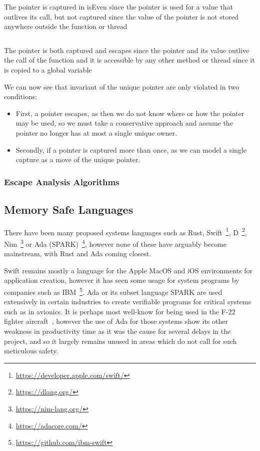 \documentclass{proposal}
\begin{document}
    \begin{listing}
        \inputminted{c++}{code/capture-example.cpp}
        \caption{The pointer is captured in isEven since the pointer is used for a value that outlives its call, but not captured since the value of the pointer is not stored anywhere outside the function or thread}
        \label{lst:capture-example}
    \end{listing}

    \begin{listing}
        \inputminted{c++}{code/escape-example.cpp}
        \caption{The pointer is both captured and escapes since the pointer and its value outlive the call of the function and it is accessible by any other method or thread since it is copied to a global variable}
        \label{lst:escape-example}
    \end{listing}

    We can now see that invariant of the unique pointer are only violated in two conditions:
    \begin{itemize}
        \item First, a pointer escapes, as then we do not know where or how the pointer may be used, so we must take a conservative approach and assume the pointer no longer has at most a single unique owner.
        \item Secondly, if a pointer is captured more than once, as we can model a single capture as a move of the unique pointer.
    \end{itemize}

    \subsubsection{Escape Analysis Algorithms}\label{subsubsec:escape-analysis-algorithms}

    \subsection{Memory Safe Languages}\label{subsec:rust}

    There have been many proposed systems languages such as Rust, Swift~\footnote{\url{https://developer.apple.com/swift/}}, D~\footnote{\url{https://dlang.org/}}, Nim~\footnote{\url{https://nim-lang.org/}} or Ada (SPARK)~\footnote{\url{https://adacore.com/}}, however none of these have arguably become mainstream, with Rust and Ada coming closest.

    Swift remains mostly a language for the Apple MacOS and iOS environments for application creation, however it has seen some usage for system programs by companies such as IBM~\footnote{\url{https://github.com/ibm-swift}}.
    Ada or its subset language SPARK are used extensively in certain industries to create verifiable programs for critical systems such as in avionics.
    It is perhaps most well-know for being used in the F-22 fighter aircraft~\cite{malas1997f}, however the use of Ada for those systems show its other weakness in productivity time as it was the cause for several delays in the project, and so it largely remains unused in areas which do not call for such meticulous safety.
\end{document}
